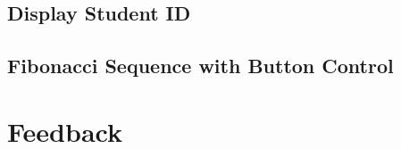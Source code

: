 \subsection{Display Student ID}
\subsection{Fibonacci Sequence with Button Control}
\section{Feedback}
\paragraph{}
